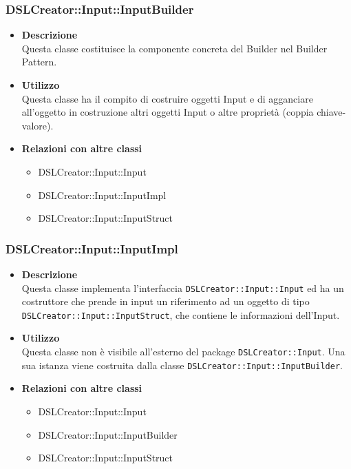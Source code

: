  \subsubsection{DSLCreator::Input::InputBuilder}
                    \begin{itemize}
                        \item \textbf{Descrizione} \hfill \\
                          Questa classe costituisce la componente concreta del Builder nel Builder Pattern.
                        \item \textbf{Utilizzo} \hfill \\
                          Questa classe ha il compito di costruire oggetti Input e di agganciare all'oggetto in costruzione altri oggetti Input o altre proprietà (coppia chiave-valore).
                        \item \textbf{Relazioni con altre classi}
                            \begin{itemize}
                              \item DSLCreator::Input::Input
                              \item DSLCreator::Input::InputImpl
                              \item DSLCreator::Input::InputStruct
                            \end{itemize}
                    \end{itemize}  

 \subsubsection{DSLCreator::Input::InputImpl}
                    \begin{itemize}
                        \item \textbf{Descrizione} \hfill \\
                          Questa classe implementa l'interfaccia \texttt{DSLCreator::Input::Input} ed ha un costruttore che prende in input un riferimento ad un oggetto di tipo \texttt{DSLCrea\-tor::Input::InputStruct}, che contiene le informazioni dell'Input.
                        \item \textbf{Utilizzo} \hfill \\
                          Questa classe non è visibile all'esterno del package \texttt{DSLCreator::Input}. Una sua istanza viene costruita dalla classe \texttt{DSLCreator::Input::InputBuilder}.
                        \item \textbf{Relazioni con altre classi}
                            \begin{itemize}
                              \item DSLCreator::Input::Input
                              \item DSLCreator::Input::InputBuilder
                              \item DSLCreator::Input::InputStruct
                            \end{itemize}
                    \end{itemize}  

